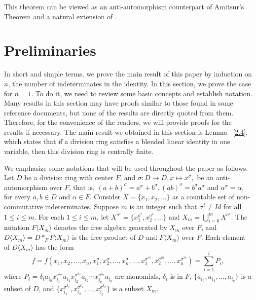 \documentclass{cimart}
\begin{document}
This theorem can be viewed as an anti-automorphism counterpart of Amitsur's Theorem and a natural extension of \cite{Pa_Des}. 

\section{Preliminaries} 

In short and simple terms, we prove the main result of this paper by induction on $n$, the number of indeterminates in the identity. In this section, we prove the case for $n=1$. To do it, we need to review some basic concepts and establish notation. Many results in this section may have proofs similar to those found in some reference documents, but none of the results are directly quoted from them. Therefore, for the convenience of the readers, we will provide proofs for the results if necessary.  The main result we obtained in this section is Lemma ~\ref{2.4}, which states that if a division ring satisfies a blended linear identity in one variable, then this division ring is centrally finite.

We emphasize some notations that will be used throughout the paper as follows. Let $D$ be a division ring with center $F$, and $\sigma: D\to D, x\mapsto x^\sigma,$ be an anti-automorphism over $F$, that is, $(a+b)^\sigma=a^\sigma+b^\sigma, (ab)^\sigma=b^\sigma a^\sigma$ and $\alpha^\sigma=\alpha$, for every $a,b\in D$ and $\alpha\in F$. Consider $X=\{x_1,x_2,\dots\}$ as a countable set of non-commutative indeterminates. Suppose $m$ is an integer such that $\sigma^i\neq Id$ for all $1\leq i\leq m$. For each $1\leq i\leq m$, let $X^{\sigma^i}=\{x_1^{\sigma^i},x_2^{\sigma^i},\dots\}$ and $X_m=\bigcup_{i=0}^mX^{\sigma^i}$. The notation $F\langle X_m\rangle$ denotes the free algebra generated by $X_m$ over $F$, and $D\langle X_m\rangle=D*_FF\langle X_m\rangle$ is the free product of $D$ and $F\langle X_m\rangle$ over $F$. Each element of $D\langle X_m\rangle$ has the form 
\[
f=f(x_1,x_2,\dots,x_n,x_1^\sigma,x_2^\sigma,\dots,x_n^\sigma,\dots,x_1^{\sigma^m},x_2^{\sigma^m},\dots,x_n^{\sigma^m})=\sum_{i=1}^lP_i,
\]
where $P_i=\delta_ia_{i_0}x_{i_1}^{\sigma^{k_1}}a_{i_1}x_{i_2}^{\sigma^{k_2}}a_{i_2}\cdots x_{i_q}^{\sigma^{k_q}}a_{i_q}$ are monomials, $\delta_i$ is in $F$, $\{a_{i_0},a_{i_1}, \dots, a_{i_q}\}$ is a subset of $ D$, and $\{x_{i_1}^{\sigma^{k_1}},x_{i_2}^{\sigma^{k_2}},\dots,x_{i_q}^{\sigma^{k_q}}\}$ is a subset $X_m$.
\end{document}
